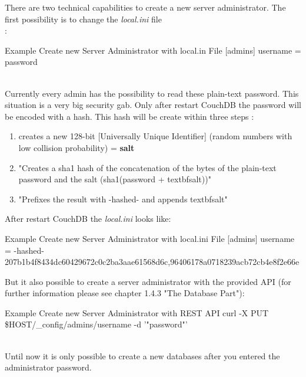 There are two technical capabilities to create a new server administrator. The first possibility is to change the \textit{local.ini} file \\ \parencite{ApacheSoftwareFoundation.2013.AdminAccount}:
\begin{mylisting}{Example Create new Server Administrator with local.in File \parencite{ApacheSoftwareFoundation.2013.AdminAccount}}
[admins]
username = password
\end{mylisting}\\
Currently every admin has the possibility to read these plain-text password. This situation is a very big security gab. Only after restart CouchDB the password will be encoded with a hash. This hash will be create within three steps \parencite{Anderson.2010.Buch}:
\begin{enumerate}
\item creates a new 128-bit [Universally Unique Identifier] (random numbers with low collision probability) = \textbf{salt} \parencite{Anderson.2010.Buch}
\item "Creates a sha1 hash of the concatenation of the bytes of the plain-text password and the salt (sha1(password + textbf{salt}))" \\ \parencite{Anderson.2010.Buch}
\item "Prefixes the result with -hashed- and appends textbf{salt}" \\ \parencite{Anderson.2010.Buch}
\end{enumerate}
After restart CouchDB the \textit{local.ini} looks like:
\begin{mylisting}{Example Create new Server Administrator with local.ini File \parencite{ApacheSoftwareFoundation.2013.AdminAccount}}
[admins]
username = -hashed-207b1b4f8434dc60429672c0c2ba3aae61568d6c,96406178a0718239acb72cb4e8f2e66e
\end{mylisting}
But it also possible to create a server administrator with the provided API (for further information please see chapter 1.4.3 "The Database Part"): \\ \parencite{Anderson.2010.Buch}
\begin{mylisting}{Example Create new Server Administrator with REST API \parencite{Anderson.2010.Buch}}
curl -X PUT \$HOST/_config/admins/username -d '"password"'
\end{mylisting} \\
Until now it is only possible to create a new databases after you entered the administrator password. \\
\\
